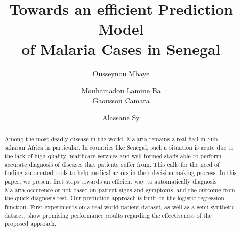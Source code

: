 \documentclass[runningheads]{llncs}
\begin{document}
%
\title{Towards an efficient Prediction Model\\ of Malaria Cases in Senegal}
%
%
\author{Ousseynou Mbaye \and Mouhamadou Lamine Ba \\ Gaoussou Camara \and Alassane Sy}
%
%
%
\maketitle              %
%
\begin{abstract}
Among  the most deadly disease in the world, Malaria remains a real flail in Sub-saharan Africa 
in particular. In countries like Senegal, such a situation is acute due to the lack of high quality
healthcare services and well-formed staffs able to perform accurate diagnosis of diseases that patients suffer from. 
This calls for the need of finding automated tools to help medical actors in their decision making process.
In this paper, we present first steps towards an efficient way to automatically diagnosis Malaria occurence or not 
based on patient signs and symptoms, and the outcome from the quick diagnosis test. Our prediction approach is built
on the logistic regression function. First expermients on a real world patient dataset, as well as a semi-synthetic dataset,
show promising performance results regarding the effectiveness of the proposed approach.
 
\end{abstract}
%
%












%
%
%


%
\end{document}
